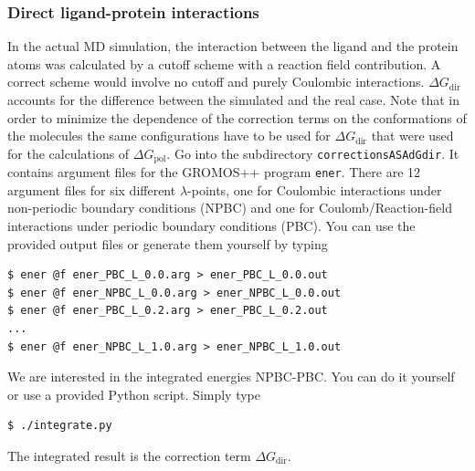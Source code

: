 \subsubsection{Direct ligand-protein interactions}
In the actual MD simulation, the interaction between the ligand and
the protein atoms was calculated by a cutoff scheme with a reaction
field contribution. A correct scheme would involve no cutoff and
purely Coulombic interactions. $\Delta
G_{\text{dir}}$ accounts for the difference between the simulated and the
real case. Note that in order to minimize the dependence of the
correction terms on the conformations of the molecules the same
configurations have to be used for $\Delta
G_{\text{dir}}$ that were used for the calculations of $\Delta
G_{\text{pol}}$. Go into the subdirectory
\texttt{corrections\/ASA\/dGdir}. It contains argument files for the
GROMOS++ program \texttt{ener}. There are 12 argument files for six
different $\lambda$-points,
one for Coulombic interactions under non-periodic boundary conditions
(NPBC) and one for Coulomb/Reaction-field interactions under periodic
boundary conditions (PBC). You can use the provided output files or
generate them yourself by typing
\begin{lstlisting}
$ ener @f ener_PBC_L_0.0.arg > ener_PBC_L_0.0.out
$ ener @f ener_NPBC_L_0.0.arg > ener_NPBC_L_0.0.out
$ ener @f ener_PBC_L_0.2.arg > ener_PBC_L_0.2.out
...
$ ener @f ener_NPBC_L_1.0.arg > ener_NPBC_L_1.0.out
\end{lstlisting}
%
We are interested in the integrated energies NPBC-PBC. You can do it
yourself or use a provided Python script. Simply type
\begin{lstlisting}
$ ./integrate.py 
\end{lstlisting}
The integrated result is the correction term $\Delta G_{\text{dir}}$. %

